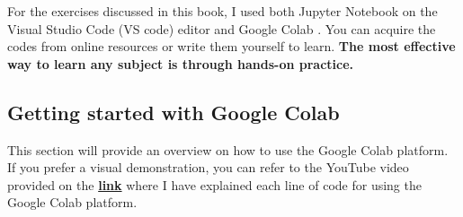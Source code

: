 For the exercises discussed in this book, I used both Jupyter Notebook on the Visual Studio Code (VS code) editor \cite{web:VScode} and Google Colab \cite{web:googlecolab}. You can acquire the codes from online resources or write them yourself to learn.\textbf{ The most effective way to learn any subject is through hands-on practice.}


\subsection{Getting started with Google Colab}
This section will provide an overview on how to use the Google Colab platform. If you prefer a visual demonstration, you can refer to the YouTube video provided on the \href{https://youtu.be/9Dt8inY5lhY}{\textbf{link}} \cite{web:myoYouTube} where I have explained each line of code for using the Google Colab platform.

